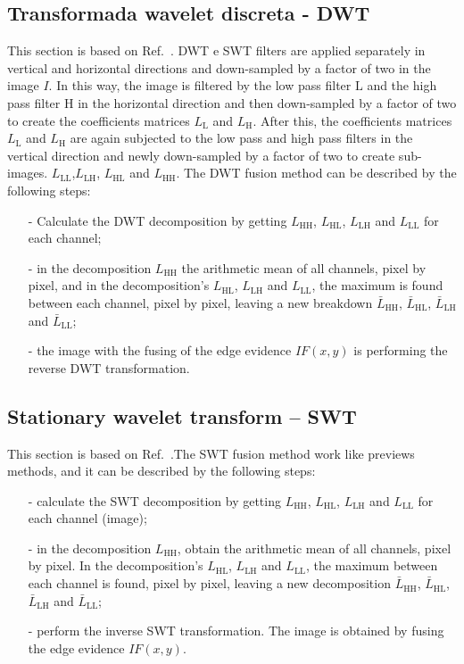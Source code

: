 \documentclass[conference]{IEEEtran}
\begin{document}
\subsection{Transformada wavelet discreta - DWT} 
This section is based on Ref.~\cite{n_r}. DWT e SWT filters are applied separately in vertical and horizontal directions and down-sampled by a factor of two in the image $I$. In this way, the image is filtered by the low pass filter $\text{L}$ and the high pass filter $\text{H}$ in the horizontal direction and then down-sampled by a factor of two to create the coefficients matrices $L_\text{L}$ and $L_\text{H}$. After this, the coefficients matrices $L_\text{L}$ and $L_\text{H}$ are again subjected to the low pass and high pass filters in the vertical direction and newly down-sampled by a factor of two to create sub-images. $ L_\text{LL}$,$L_\text{LH}$, $L_\text{HL}$ and $L_\text{HH}$. The DWT fusion method can be described by the following steps:
\begin{itemize}
\item[-] Calculate the DWT decomposition by getting $L_\text{HH}$, $L_\text{HL}$, $L_\text{LH}$ and $L_\text{LL}$ for each channel;
\item[-] in the decomposition $L_\text{HH}$ the arithmetic mean of all channels, pixel by pixel, and in the decomposition's $L_\text{HL}$, $L_\text{LH}$ and $L_\text{LL}$, the maximum is found between each channel, pixel by pixel, leaving a new breakdown $\bar{L}_\text{HH}$, $\bar{L}_\text{HL}$, $\bar{L}_\text{LH}$ and $\bar{L}_\text{LL}$;
\item[-] the image with the fusing of the edge evidence $IF(x,y)$ is performing the reverse DWT transformation.  
\end{itemize}

\subsection{Stationary wavelet transform -- SWT} 

This section is based on Ref.~\cite{n_r}.The SWT fusion method work like previews methods, and it can be described by the following steps:
\begin{itemize}
\item[-] calculate the SWT decomposition by getting $L_\text{HH}$, $L_\text{HL}$, $L_\text{LH}$ and $L_\text{LL}$ for each channel (image); %
\item[-] in the decomposition $L_\text{HH}$, obtain the arithmetic mean of all channels, pixel by pixel. In the decomposition's $L_\text{HL}$, $L_\text{LH}$ and $L_\text{LL}$, the maximum between each channel is found, pixel by pixel, leaving a new decomposition $\bar{L}_\text{HH}$, $\bar{L}_\text{HL}$, $\bar{L}_\text{LH}$ and $\bar{L}_\text{LL}$;
\item[-] perform the inverse SWT transformation. The image is obtained by fusing the edge evidence $IF(x,y)$.  
\end{itemize}
\end{document}
